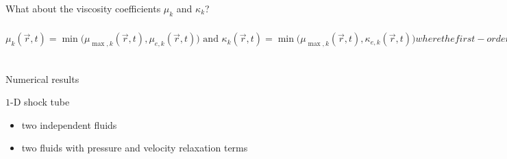 \documentclass[xcolor=dvipsnames,10pt]{beamer}
\newcommand{\resi}{R}
\newcommand{\resinew}{\widetilde{\resi}}
\newcommand{\grad}{\vec{\nabla}}
\newcommand{\norm}{\textrm{norm}}
\begin{document}
\begin{frame}{What about the viscosity coefficients $\mu_k$ and $\kappa_k$?}
\begin{subequations}
%
\begin{equation}
\mu_k(\vec{r},t)    = \min \Big (\mu_{\max ,k}(\vec{r},t), \mu_{e,k} (\vec{r},t)    \Big) \text{  and  }
\kappa_k(\vec{r},t) = \min \Big (\mu_{\max ,k}(\vec{r},t), \kappa_{e,k} (\vec{r},t) \Big ) \nonumber
\end{equation}
%
where the first-order viscosity is given by
\begin{equation}
  \kappa_{\max ,k}(\vec{r},t)  = \mu_{\max ,k} (\vec{r},t) = \frac{h}{2} \Big ( ||\vec{u}_k|| + c_k \Big ) \nonumber
\end{equation}
%
and the entropy viscosity coefficients by 
%
\begin{equation}
\kappa_{e,k}(\vec{r},t) = \frac{h^2 \max(\resinew_k, J_k)}{ \rho_k c_k^2 }  \text{  and  }
\mu_{e,k}(\vec{r},t)    = \frac{h^2 \max(\resinew_k, J_k)}{ \norm_{P,k}^\mu} \nonumber
\end{equation}
%
where
%
\begin{equation}
\norm_{P,k}^\mu =  \left\{
\begin{array}{ll}
 \rho_k ||\vec{u}_k ||^2       & \text{ if } \left| \resinew_k^* \right| \geq M_k \text{ (i.e., non-isentropic flow)} \\
 \rho_k c_k^2 = \norm_{P,k}^\kappa & \text{ otherwise} 
\end{array}
\right. \nonumber
\end{equation}
% 
with the jumps given by
%
\begin{equation}
J_k = || \vec{u}_k || \max \Big ( [[ \grad P_k \cdot \vec{n} ]], c_k^2 [[\grad \rho_k \cdot \vec{n}]] \Big) \nonumber
\end{equation}
\end{subequations}
\end{frame}
\begin{frame}{Numerical results}
\begin{block}{$1$-D shock tube}
\begin{itemize}
\setlength{\itemsep}{10pt}
\item two independent fluids
\item two fluids with pressure and velocity relaxation terms
\end{itemize}
\end{block}
\end{frame}
\end{document}
